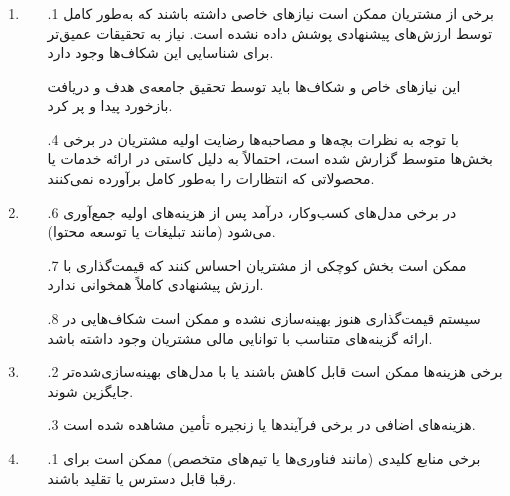 \documentclass[dvipsnames, svgnames, x11names, 11pt]{article}
\begin{document}
\subsubsection{}
\begin{enumerate}
\item {}
\begin{itemize}
\item[\theenumi$.$1]
برخی از مشتریان ممکن است نیازهای خاصی داشته باشند که به‌طور کامل توسط ارزش‌های پیشنهادی پوشش داده نشده است. نیاز به تحقیقات عمیق‌تر برای شناسایی این شکاف‌ها وجود دارد.

این نیاز‌‌‌های خاص و شکاف‌ها باید توسط تحقیق جامعه‌ی هدف و دریافت بازخورد پیدا و پر کرد.

\item[\theenumi$.$4]
با توجه به نظرات بچه‌ها و مصاحبه‌ها رضایت اولیه مشتریان در برخی بخش‌ها متوسط گزارش شده است، احتمالاً به دلیل کاستی در ارائه خدمات یا محصولاتی که انتظارات را به‌طور کامل برآورده نمی‌کنند.
\end{itemize}

\item {}
\begin{itemize}
\item[\theenumi$.$6]
در برخی مدل‌های کسب‌وکار، درآمد پس از هزینه‌های اولیه جمع‌آوری می‌شود (مانند تبلیغات یا توسعه محتوا).

\item[\theenumi$.$7]
ممکن است بخش کوچکی از مشتریان احساس کنند که قیمت‌گذاری با ارزش پیشنهادی کاملاً همخوانی ندارد.

\item[\theenumi$.$8]
سیستم قیمت‌گذاری هنوز بهینه‌سازی نشده و ممکن است شکاف‌هایی در ارائه گزینه‌های متناسب با توانایی مالی مشتریان وجود داشته باشد.
\end{itemize}

\item {}
\begin{itemize}
\item[\theenumi$.$2]
برخی هزینه‌ها ممکن است قابل کاهش باشند یا با مدل‌های بهینه‌سازی‌شده‌تر جایگزین شوند.

\item[\theenumi$.$3]
هزینه‌های اضافی در برخی فرآیندها یا زنجیره تأمین مشاهده شده است.
\end{itemize}

\item {}
\begin{itemize}
\item[\theenumi$.$1]
برخی منابع کلیدی (مانند فناوری‌ها یا تیم‌های متخصص) ممکن است برای رقبا قابل دسترس یا تقلید باشند.


\end{itemize}
\end{enumerate}
\end{document}
